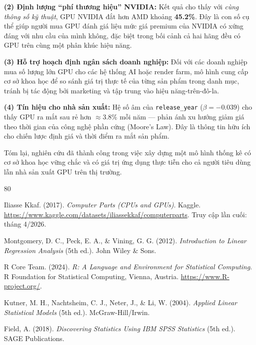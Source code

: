 \documentclass[a4paper]{article}
\begin{document}
\textbf{(2) Định lượng ``phí thương hiệu'' NVIDIA:} Kết quả cho thấy với \textit{cùng thông số kỹ thuật}, GPU NVIDIA đắt hơn AMD khoảng \textbf{45.2\%}. Đây là con số cụ thể giúp người mua GPU đánh giá liệu mức giá premium của NVIDIA có xứng đáng với nhu cầu của mình không, đặc biệt trong bối cảnh cả hai hãng đều có GPU trên cùng một phân khúc hiệu năng.

\textbf{(3) Hỗ trợ hoạch định ngân sách doanh nghiệp:} Đối với các doanh nghiệp mua số lượng lớn GPU cho các hệ thống AI hoặc render farm, mô hình cung cấp cơ sở khoa học để so sánh giá trị thực tế của từng sản phẩm trong danh mục, tránh bị tác động bởi marketing và tập trung vào hiệu năng-trên-đô-la.

\textbf{(4) Tín hiệu cho nhà sản xuất:} Hệ số âm của \texttt{release\_year} ($\beta = -0.039$) cho thấy GPU ra mắt sau rẻ hơn $\approx 3.8\%$ mỗi năm --- phản ánh xu hướng giảm giá theo thời gian của công nghệ phần cứng (Moore's Law). Đây là thông tin hữu ích cho chiến lược định giá và thời điểm ra mắt sản phẩm.

Tóm lại, nghiên cứu đã thành công trong việc xây dựng một mô hình thống kê có cơ sở khoa học vững chắc và có giá trị ứng dụng thực tiễn cho cả người tiêu dùng lẫn nhà sản xuất GPU trên thị trường.

\begin{thebibliography}{80}
	
	Iliasse Kkaf. (2017).
	\textit{Computer Parts (CPUs and GPUs)}.
	Kaggle.
	\url{https://www.kaggle.com/datasets/iliassekkaf/computerparts}.
	Truy cập lần cuối: tháng 4/2026.
	
	Montgomery, D. C., Peck, E. A., \& Vining, G. G. (2012).
	\textit{Introduction to Linear Regression Analysis} (5th ed.).
	John Wiley \& Sons.
	
	R Core Team. (2024).
	\textit{R: A Language and Environment for Statistical Computing}.
	R Foundation for Statistical Computing, Vienna, Austria.
	\url{https://www.R-project.org/}.
	
	Kutner, M. H., Nachtsheim, C. J., Neter, J., \& Li, W. (2004).
	\textit{Applied Linear Statistical Models} (5th ed.).
	McGraw-Hill/Irwin.
	
	Field, A. (2018).
	\textit{Discovering Statistics Using IBM SPSS Statistics} (5th ed.).
	SAGE Publications.
	
\end{thebibliography}
\end{document}
